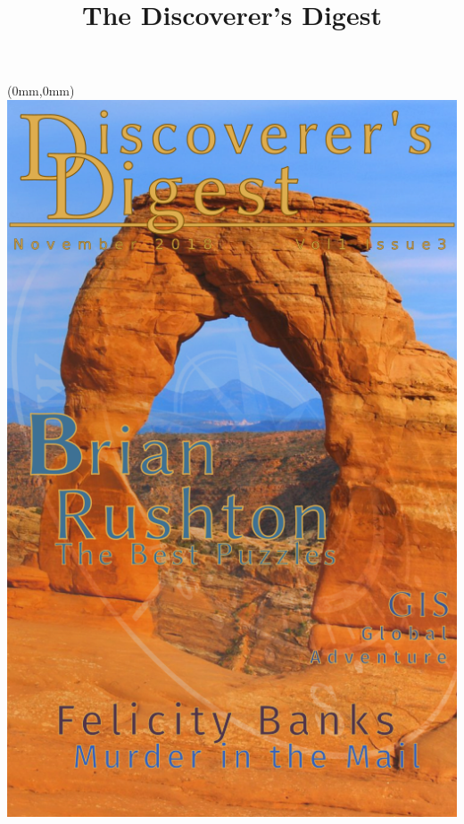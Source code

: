 \documentclass[11.75pt,openany,final]{memoir}
\title{The Discoverer's Digest}
\begin{document}

\chapter*{}

\begin{textblock*}{70.9mm}(0mm,0mm)
  \includegraphics[width=\paperwidth]{./media/images/nov_cover.png}
\end{textblock*}
\thispagestyle{empty}\clearpage %
\end{document}

